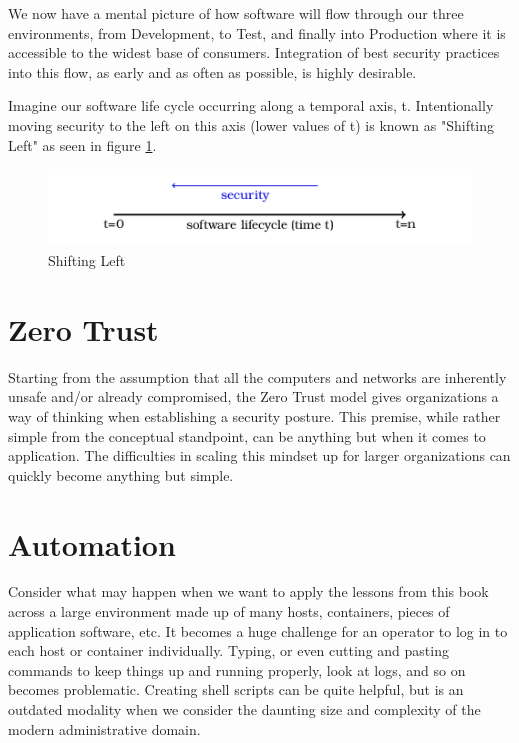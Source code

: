\justify
We now have a mental picture of how software will flow through our
three environments, from Development, to Test, and finally into Production
where it is accessible to the widest base of consumers. Integration of 
best security practices into this flow, as early and as often as possible, 
is highly desirable. 

\justify
Imagine our software life cycle occurring along a temporal 
axis, t. Intentionally moving security to the left on this axis (lower 
values of t) is known as "Shifting Left" as seen in 
figure \ref{fig:shift}.

\justify
\begin{figure}[!htb]
	\centering
	\includegraphics{../images/shift_left.png}
	\caption{Shifting Left}
	\label{fig:shift}
\end{figure}

\section{Zero Trust}

\justify
Starting from the assumption that all the computers and networks are
inherently unsafe and/or already compromised, the Zero Trust
model gives organizations a way of thinking when establishing a security
posture. \cite{zerotrust} This premise, while rather simple from 
the conceptual standpoint, can be anything but when it comes to
application. The difficulties in scaling this mindset up for larger
organizations can quickly become anything but simple. 

\section{Automation}

\justify
Consider what may happen when we want to apply the lessons from this book
across a large environment made up of many hosts, containers, pieces of
application software, etc. It becomes a huge challenge for an operator
to log in to each host or container individually. Typing, or even cutting
and pasting commands to keep things up and running properly, look at logs,
and so on becomes problematic. Creating shell scripts can be quite helpful,
but is an outdated modality when we consider the daunting size and complexity
of the modern administrative domain.

